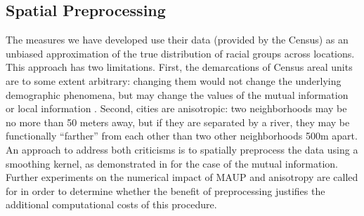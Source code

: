 \documentclass[9pt,twocolumn,twoside]{pnas-new}
\begin{document}
	\subsection*{Spatial Preprocessing}
		The measures we have developed use their data (provided by the Census) as an unbiased approximation of the true distribution of racial groups across locations. This approach has two limitations. First, the demarcations of Census areal units are to some extent arbitrary: changing them would not change the underlying demographic phenomena, but may change the values of the mutual information or local information \cite{Openshaw1981}. Second, cities are anisotropic: two neighborhoods may be no more than 50 meters away, but if they are separated by a river, they may be functionally ``farther'' from each other than two other neighborhoods 500m apart. An approach to address both criticisms is to spatially preprocess the data using a smoothing kernel, as demonstrated in \cite{Roberto2015} for the case of the mutual information. Further experiments on the numerical impact of MAUP and anisotropy are called for in order to determine whether the benefit of preprocessing justifies the additional computational costs of this procedure.   
\end{document}
